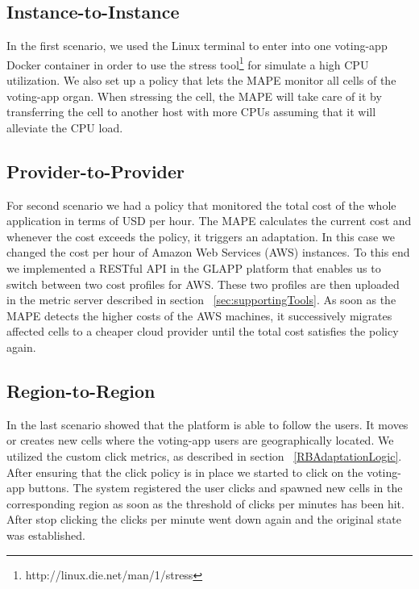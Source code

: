 \documentclass{seal_thesis}
\begin{document}
\subsection{Instance-to-Instance}

In the first scenario, we used the Linux terminal to enter into one voting-app Docker container in order to use the stress tool\footnote{http://linux.die.net/man/1/stress} for simulate a high CPU utilization.
We also set up a policy that lets the MAPE monitor all cells of the voting-app organ. When stressing the cell, the MAPE will take care of it by transferring the cell to another host with more CPUs assuming that it will alleviate the CPU load.

\subsection{Provider-to-Provider}

For second scenario we had a policy that monitored the total cost of the whole application in terms of USD per hour.
The MAPE calculates the current cost and whenever the cost exceeds the policy, it triggers an adaptation.
In this case we changed the cost per hour of Amazon Web Services (AWS) instances.
To this end we implemented a RESTful API in the GLAPP platform that enables us to switch between two cost profiles for AWS.
These two profiles are then uploaded in the metric server described in section ~\ref{sec:supportingTools}.
As soon as the MAPE detects the higher costs of the AWS machines, it successively migrates affected cells to a cheaper cloud provider until the total cost satisfies the policy again.

\subsection{Region-to-Region}
In the last scenario showed that the platform is able to follow the users.
It moves or creates new cells where the voting-app users are geographically located.
We utilized the custom click metrics, as described in section ~\ref{RBAdaptationLogic}.
After ensuring that the click policy is in place we started to click on the voting-app buttons.
The system registered the user clicks and spawned new cells in the corresponding region as soon as the threshold of clicks per minutes has been hit.
After stop clicking the clicks per minute went down again and the original state was established.


\end{document}
